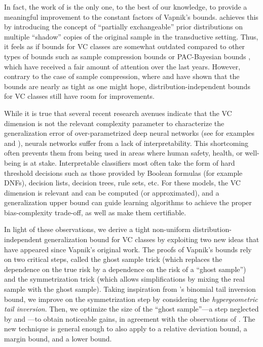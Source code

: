 \documentclass[twoside,11pt]{article}
\begin{document}
In fact, the work of \citet{catoni2004improved} is the only one, to the best of our knowledge, to provide a meaningful improvement to the constant factors of Vapnik's bounds.
\citeauthor{catoni2004improved} achieves this by introducing the concept of ``partially exchangeable'' prior distributions on multiple ``shadow'' copies of the original sample in the transductive setting.
Thus, it feels as if bounds for VC classes are somewhat outdated compared to other types of bounds such as sample compression bounds \citep{floyd95sample} or PAC-Bayesian bounds \citep{mcallester1999some}, which have received a fair amount of attention over the last years.
However, contrary to the case of sample compression, where \citet{langford05} and \citet{Laviolette09} have shown that the bounds are nearly as tight as one might hope, distribution-independent bounds for VC classes still have room for improvements.

While it is true that several recent research avenues indicate that the VC dimension is not the relevant complexity parameter to characterize the generalization error of over-parametrized deep neural networks (see for examples \citet{bartlett2019nearly} and \citet{zhang2021understanding}), neurals networks suffer from a lack of interpretability.
This shortcoming often prevents them from being used in areas where human safety, health, or well-being is at stake.
Interpretable classifiers most often take the form of hard threshold decisions such as those provided by Boolean formulas (for example DNFs), decision lists, decision trees, rule sets, etc.
For these models, the VC dimension is relevant and can be computed (or approximated), and a generalization upper bound can guide learning algorithms to achieve the proper bias-complexity trade-off, as well as make them certifiable.

In light of these observations, we derive a tight non-uniform distribution-independent generalization bound for VC classes by exploiting two new ideas that have appeared since Vapnik's original work.
The proofs of Vapnik's bounds rely on two critical steps, called the ghost sample trick (which replaces the dependence on the true risk by a dependence on the risk of a ``ghost sample'') and the symmetrization trick (which allows simplifications by mixing the real sample with the ghost sample).
Taking inspiration from \citet{langford05}'s binomial tail inversion bound, we improve on the symmetrization step by considering the \emph{hypergeometric tail inversion}.
Then, we optimize the size of the ``ghost sample''---a step neglected by \citet{vapnik98} and \citet{as-93}---to obtain noticeable gains, in agreement with the observations of \citet{catoni2004improved}.
The new technique is general enough to also apply to a relative deviation bound, a margin bound, and a lower bound.
\end{document}
